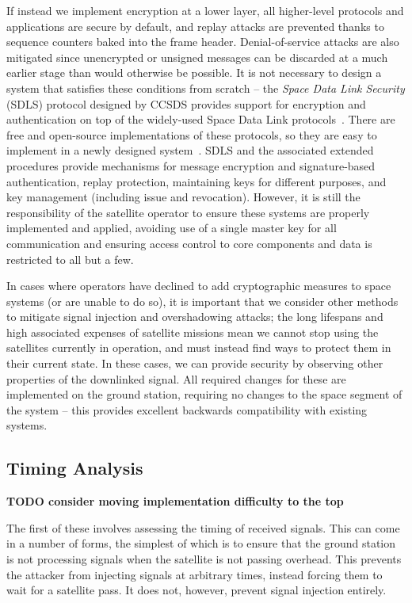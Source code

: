 If instead we implement encryption at a lower layer, all higher-level protocols and applications are secure by default, and replay attacks are prevented thanks to sequence counters baked into the frame header.
Denial-of-service attacks are also mitigated since unencrypted or unsigned messages can be discarded at a much earlier stage than would otherwise be possible.
It is not necessary to design a system that satisfies these conditions from scratch -- the \textit{Space Data Link Security} (SDLS) protocol designed by CCSDS provides support for encryption and authentication on top of the widely-used Space Data Link protocols~\cite{ccsdsSpace2015,ccsdsSpace2020}.
There are free and open-source implementations of these protocols, so they are easy to implement in a newly designed system~\cite{nasaCryptolib}.
SDLS and the associated extended procedures provide mechanisms for message encryption and signature-based authentication, replay protection, maintaining keys for different purposes, and key management (including issue and revocation).
However, it is still the responsibility of the satellite operator to ensure these systems are properly implemented and applied, avoiding use of a single master key for all communication and ensuring access control to core components and data is restricted to all but a few.

In cases where operators have declined to add cryptographic measures to space systems (or are unable to do so), it is important that we consider other methods to mitigate signal injection and overshadowing attacks; the long lifespans and high associated expenses of satellite missions mean we cannot stop using the satellites currently in operation, and must instead find ways to protect them in their current state.
In these cases, we can provide security by observing other properties of the downlinked signal.
All required changes for these are implemented on the ground station, requiring no changes to the space segment of the system -- this provides excellent backwards compatibility with existing systems.


\subsection{Timing Analysis}

\textbf{TODO consider moving implementation difficulty to the top}

The first of these involves assessing the timing of received signals.
This can come in a number of forms, the simplest of which is to ensure that the ground station is not processing signals when the satellite is not passing overhead.
This prevents the attacker from injecting signals at arbitrary times, instead forcing them to wait for a satellite pass.
It does not, however, prevent signal injection entirely.

